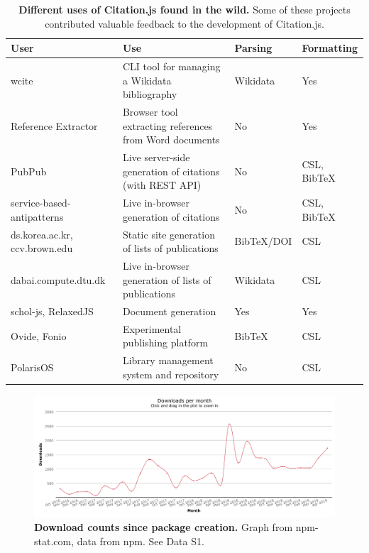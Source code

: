 \documentclass[fleqn,10pt,lineno]{wlpeerj} %
\begin{document}
\begin{table}[bt]
\caption{\textbf{Different uses of Citation.js found in the wild.} Some of these projects contributed valuable feedback to the development of Citation.js.}
\label{table:uses}
\begin{tabular}{|p{3cm}|p{6cm}|l|l|}
\hline
\textbf{User}       & \textbf{Use}                                             & \textbf{Parsing} & \textbf{Formatting} \\ \hline
wcite \citep{Voss2019wikicite/wcite} & CLI tool for managing a Wikidata bibliography            & Wikidata         & Yes                 \\ \hline
Reference Extractor \citep{Zelle2018rmzelle/ref-extractor} & Browser tool extracting references from Word documents   & No               & Yes                 \\ \hline
PubPub \citep{shihipar_pubpub:_2018} & Live server-side generation of citations (with REST API) & No               & CSL, BibTeX         \\ \hline
service-based-antipatterns \citep{Boceck2019xJREB/service-based-antipatterns} & Live in-browser generation of citations                  & No               & CSL, BibTeX         \\ \hline
ds.korea.ac.kr, ccv.brown.edu & Static site generation of lists of publications          & BibTeX/DOI       & CSL                 \\ \hline
dabai.compute.dtu.dk          & Live in-browser generation of lists of publications      & Wikidata         & CSL                 \\ \hline
schol-js, RelaxedJS \citep{null2018schol-js/schol,null2018RelaxedJS/ReLaXed} & Document generation                                      & Yes              & Yes                 \\ \hline
Ovide, Fonio \citep{Mourat2019peritext/ovide,Mourat2019medialab/fonio} & Experimental publishing platform                         & BibTeX           & CSL                 \\ \hline
PolarisOS \citep{Ribeyre2019MyScienceWork/PolarisOS} & Library management system and repository                 & No               & CSL                 \\ \hline
\end{tabular}
\end{table}

\begin{figure}[bt]
\centering
\includegraphics[width=\linewidth]{figures/Figure_5.png}
\caption{\textbf{Download counts since package creation.} Graph from npm-stat.com, data from npm. See Data S1.}
\label{fig:downloads}
\end{figure}
\end{document}
